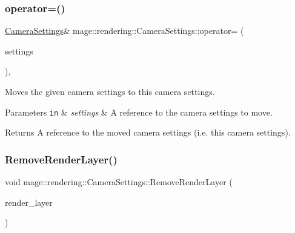 \subsubsection{\texorpdfstring{operator=()}{operator=()}\hspace{0.1cm}{\footnotesize\ttfamily [2/2]}}
{\footnotesize\ttfamily \hyperlink{classmage_1_1rendering_1_1_camera_settings}{Camera\+Settings}\& mage\+::rendering\+::\+Camera\+Settings\+::operator= (\begin{DoxyParamCaption}\item[{\hyperlink{classmage_1_1rendering_1_1_camera_settings}{Camera\+Settings} \&\&}]{settings }\end{DoxyParamCaption})\hspace{0.3cm}{\ttfamily [default]}, {\ttfamily [noexcept]}}

Moves the given camera settings to this camera settings.


\begin{DoxyParams}[1]{Parameters}
\mbox{\tt in}  & {\em settings} & A reference to the camera settings to move. \\
\hline
\end{DoxyParams}
\begin{DoxyReturn}{Returns}
A reference to the moved camera settings (i.\+e. this camera settings). 
\end{DoxyReturn}
\hypertarget{classmage_1_1rendering_1_1_camera_settings_a49c766f4880c798a90a9b8fe488a6711}{}\label{classmage_1_1rendering_1_1_camera_settings_a49c766f4880c798a90a9b8fe488a6711} 
\subsubsection{\texorpdfstring{Remove\+Render\+Layer()}{RemoveRenderLayer()}}
{\footnotesize\ttfamily void mage\+::rendering\+::\+Camera\+Settings\+::\+Remove\+Render\+Layer (\begin{DoxyParamCaption}\item[{\hyperlink{namespacemage_1_1rendering_a466c2a441ea5b26e4625c2f34e021b3d}{Render\+Layer}}]{render\+\_\+layer }\end{DoxyParamCaption})\hspace{0.3cm}{\ttfamily [noexcept]}}

